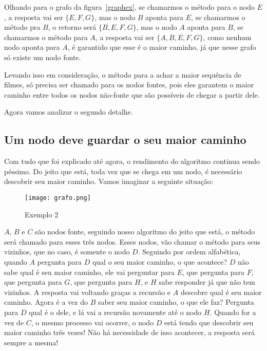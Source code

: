 \documentclass[12pt]{article}
\begin{document}
Olhando para o grafo da figura~\ref{graphex}, se chamarmos o método para o nodo $E$, a resposta vai ser $\{E, F, G\}$, mas o nodo $B$ aponta para $E$, se chamarmos o método pra $B$, o retorno será $\{B, E, F, G\}$, mas o nodo $A$ aponta para $B$, se chamarmos o método para $A$, a resposta vai ser $\{A, B, E, F, G\}$, como nenhum nodo aponta para $A$, é garantido que esse é o maior caminho, já que nesse grafo só existe um nodo fonte.

Levando isso em consideração, o método para a achar a maior sequência de filmes, só precisa ser chamado para os nodos fontes, pois eles garantem o maior caminho entre todos os nodos não-fonte que são possíveis de chegar a partir dele.

\vspace{0.5cm}

Agora vamos analizar o segundo detalhe.

\subsection{Um nodo deve guardar o seu maior caminho}

Com tudo que foi explicado até agora, o rendimento do algoritmo continua sendo péssimo. Do jeito que está, toda vez que se chega em um nodo, é necessário descobrir seu maior caminho. Vamos imaginar a seguinte situação:

\begin{figure}[H]
\centering
\texttt{[image: grafo.png]}
\caption{Exemplo 2}
\label{grafo}
\end{figure}

$A$, $B$ e $C$ são nodos fonte, seguindo nosso algoritmo do jeito que está, o método será chamado para esses três nodos. Esses nodos, vão chamar o método para seus vizinhos, que no caso, é somente o nodo $D$. Seguindo por ordem alfabética, quando $A$ pergunta para $D$ qual o seu maior caminho, o que acontece? $D$ não sabe qual é seu maior caminho, ele vai perguntar para $E$, que pergunta para $F$, que pergunta para $G$, que pergunta para $H$, e $H$ sabe responder já que não tem vizinhos. A resposta vai voltando graças a recursão e $A$ descobre qual é seu maior caminho. Agora é a vez do $B$ saber seu maior caminho, o que ele faz? Pergunta para $D$ qual é o dele, e lá vai a recursão novamente até o nodo $H$. Quando for a vez de $C$, o mesmo processo vai ocorrer, o nodo $D$ está tendo que descobrir seu maior caminho três vezes! Não há necessidade de isso acontecer, a resposta será sempre a mesma!
\end{document}
